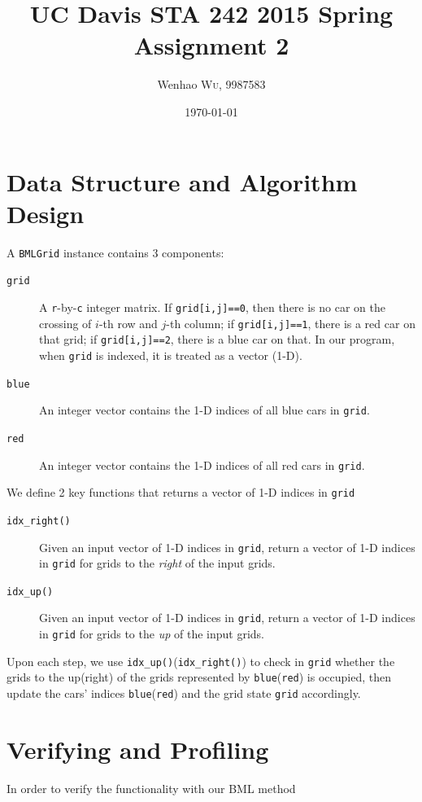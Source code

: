 \documentclass[twocolumn]{article}
\title{UC Davis STA 242 2015 Spring Assignment 2} %
\author{Wenhao \textsc{Wu}, 9987583} %
\date{\today} %
\begin{document}
\maketitle %


\section{Data Structure and Algorithm Design}
A \texttt{BMLGrid} instance contains 3 components:
\begin{description}
    \item[\texttt{grid}] A \texttt{r}-by-\texttt{c} integer matrix. If
    \texttt{grid[i,j]==0}, then there is no car on the crossing of $i$-th row
    and $j$-th column; if \texttt{grid[i,j]==1}, there is a red car on that
    grid; if \texttt{grid[i,j]==2}, there is a blue car on that. In our program,
    when \texttt{grid} is indexed, it is treated as a vector (1-D).
    \item[\texttt{blue}] An integer vector contains the 1-D indices of
    all blue cars in \texttt{grid}.
    \item[\texttt{red}] An integer vector contains the 1-D indices of
    all red cars in \texttt{grid}.
\end{description}
We define 2 key functions that returns a vector of 1-D
indices in \texttt{grid}
\begin{description}
    \item[\texttt{idx\_right()}] Given an input vector of 1-D indices in
    \texttt{grid}, return a vector of 1-D indices in \texttt{grid} for grids to
    the \emph{right} of the input grids.
    \item[\texttt{idx\_up()}] Given an input vector of 1-D indices in
    \texttt{grid}, return a vector of 1-D indices in \texttt{grid} for grids to
    the \emph{up} of the input grids.
\end{description}
Upon each step, we use \texttt{idx\_up()}(\texttt{idx\_right()}) to check in
\texttt{grid} whether the grids to the up(right) of the grids represented by
\texttt{blue}(\texttt{red}) is occupied, then update the cars' indices
\texttt{blue}(\texttt{red}) and the grid state \texttt{grid} accordingly.

\section{Verifying and Profiling}
In order to verify the functionality with our BML method
\end{document}
